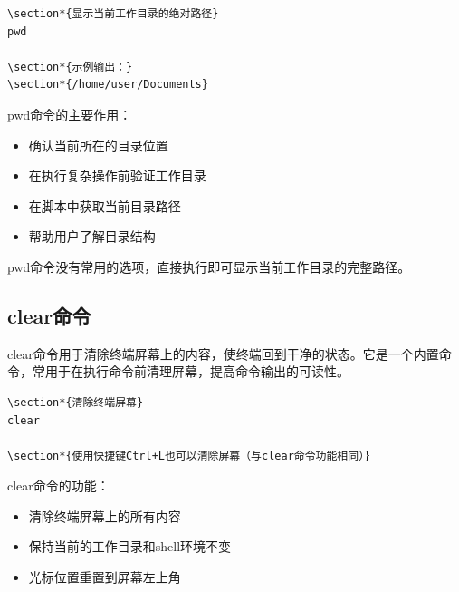 \documentclass[12pt,UTF8]{ctexbook}
\begin{document}
\begin{verbatim}
\section*{显示当前工作目录的绝对路径}
pwd

\section*{示例输出：}
\section*{/home/user/Documents}
\end{verbatim}

pwd命令的主要作用：
\begin{itemize}
    \item 确认当前所在的目录位置
    \item 在执行复杂操作前验证工作目录
    \item 在脚本中获取当前目录路径
    \item 帮助用户了解目录结构
\end{itemize}

pwd命令没有常用的选项，直接执行即可显示当前工作目录的完整路径。

\subsection{clear命令}
clear命令用于清除终端屏幕上的内容，使终端回到干净的状态。它是一个内置命令，常用于在执行命令前清理屏幕，提高命令输出的可读性。

\begin{verbatim}
\section*{清除终端屏幕}
clear

\section*{使用快捷键Ctrl+L也可以清除屏幕（与clear命令功能相同）}
\end{verbatim}

clear命令的功能：
\begin{itemize}
    \item 清除终端屏幕上的所有内容
    \item 保持当前的工作目录和shell环境不变
    \item 光标位置重置到屏幕左上角
\end{itemize}
\end{document}
